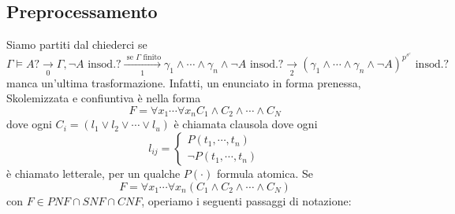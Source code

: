 \subsection{Preprocessamento}
Siamo partiti dal chiederci se 
$$
\Gamma \models A \text{?} \xrightarrow[0]{} \Gamma, \neg A \text{ insod.?} \xrightarrow[1]{\text{ se } \Gamma \text{ finito}} \gamma_1 \land \cdots \land \gamma_n \land \neg A \text{ insod.?} \xrightarrow[2]{} (\gamma_1 \land \cdots \land \gamma_n \land \neg A)^{p^{s^c}} \text{ insod.?}
$$
manca un'ultima trasformazione. Infatti, un enunciato in forma prenessa, Skolemizzata 
e confiuntiva è nella forma 
$$
F = \forall x_1 \cdots \forall x_n C_1 \land C_2 \land \cdots \land C_N
$$
dove ogni $C_i = (l_1 \lor l_2 \lor \cdots \lor l_u)$ è chiamata clausola
dove ogni 
$$
l_{ij} = \begin{cases}
        P(t_1, \cdots, t_n) \\
        \neg P(t_1, \cdots, t_n)
\end{cases}
$$
è chiamato letterale, per un qualche $P(\cdot)$ formula atomica.
Se 
$$
F = \forall x_1 \cdots \forall x_n (C_1 \land C_2 \land \cdots \land C_N)
$$
con $F \in PNF \cap SNF \cap CNF$, operiamo i seguenti passaggi di notazione: 
